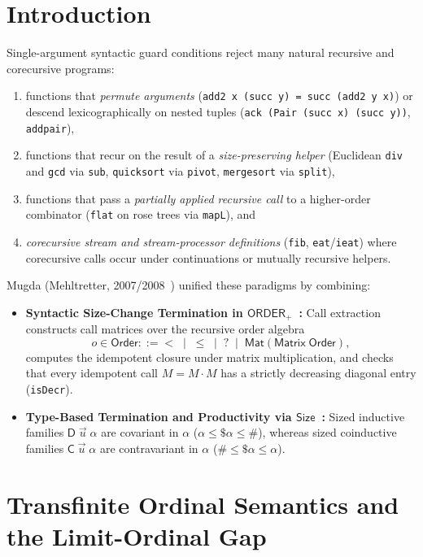 \documentclass[11pt,a4paper]{article}
\begin{document}
\section{Introduction}

Single-argument syntactic guard conditions reject many natural recursive and corecursive programs:
\begin{enumerate}
  \item functions that \emph{permute arguments} (\texttt{add2 x (succ y) = succ (add2 y x)}) or descend lexicographically on nested tuples (\texttt{ack (Pair (succ x) (succ y))}, \texttt{addpair}),
  \item functions that recur on the result of a \emph{size-preserving helper} (Euclidean \texttt{div} and \texttt{gcd} via \texttt{sub}, \texttt{quicksort} via \texttt{pivot}, \texttt{mergesort} via \texttt{split}),
  \item functions that pass a \emph{partially applied recursive call} to a higher-order combinator (\texttt{flat} on rose trees via \texttt{mapL}), and
  \item \emph{corecursive stream and stream-processor definitions} (\texttt{fib}, \texttt{eat}/\texttt{ieat}) where corecursive calls occur under continuations or mutually recursive helpers.
\end{enumerate}

Mugda (Mehltretter, 2007/2008~\cite{mehltretter2007}) unified these paradigms by combining:
\begin{itemize}
  \item \textbf{Syntactic Size-Change Termination in $\mathsf{ORDER}_+$~\cite{lee2001}:} Call extraction constructs call matrices over the recursive order algebra
  \[
    o \in \mathsf{Order} ::= {<} \;\mid\; {\le} \;\mid\; {?} \;\mid\; \mathsf{Mat}(\mathsf{Matrix}\;\mathsf{Order}),
  \]
  computes the idempotent closure under matrix multiplication, and checks that every idempotent call $M = M \cdot M$ has a strictly decreasing diagonal entry (\texttt{isDecr}).
  \item \textbf{Type-Based Termination and Productivity via $\mathsf{Size}$~\cite{abel2006,abel2010}:} Sized inductive families $\mathsf{D}\;\vec{u}\;\alpha$ are covariant in $\alpha$ ($\alpha \le \$ \alpha \le \#$), whereas sized coinductive families $\mathsf{C}\;\vec{u}\;\alpha$ are contravariant in $\alpha$ ($\# \le \$ \alpha \le \alpha$).
\end{itemize}

\section{Transfinite Ordinal Semantics and the Limit-Ordinal Gap}
\end{document}
